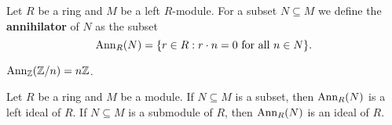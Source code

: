 %
%
%
%

Let $R$ be a ring and $M$ be a left $R$-module. For a 
subset $N\subseteq M$
we define the \textbf{annihilator} of $N$ as the subset 
\[
\operatorname{Ann}_R(N)=\{r\in R:r\cdot n=0\text{ for all }n\in N\}.
\]

\begin{example}
	$\operatorname{Ann}_{\mathbb{Z}}(\mathbb{Z}/n)=n\mathbb{Z}$.
\end{example}

\begin{exercise}
    Let $R$ be a ring and $M$ be a module. If $N\subseteq M$ is a subset, then 
	$\operatorname{Ann}_R(N)$ is a left ideal of $R$. If $N\subseteq M$ is a submodule of $R$, then 
	$\operatorname{Ann}_R(N)$ is an ideal of $R$. 
\end{exercise}


	
